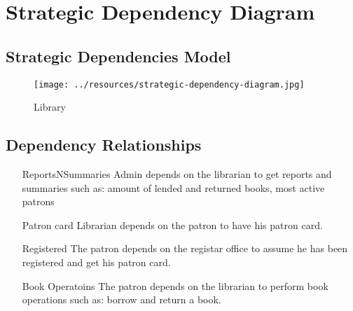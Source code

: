 \section{Strategic Dependency Diagram}

\subsection{Strategic Dependencies Model}
\begin{figure}[h]
    \centering
    \texttt{[image: ../resources/strategic-dependency-diagram.jpg]}
    \caption{Library}
    \label{fig:sd-model}
\end{figure}

\subsection{Dependency Relationships}
\begin{itemize}
    \item[ReportsNSummaries] Admin depends on the librarian to get reports and summaries such as: amount of lended and returned books, most active patrons
    \item[Patron card] Librarian depends on the patron to have his patron card.
    \item[Registered] The patron depends on the registar office to assume he has been registered and get his patron card.
    \item[Book Operatoins] The patron depends on the librarian to perform book operations such as: borrow and return a book.
\end{itemize}

